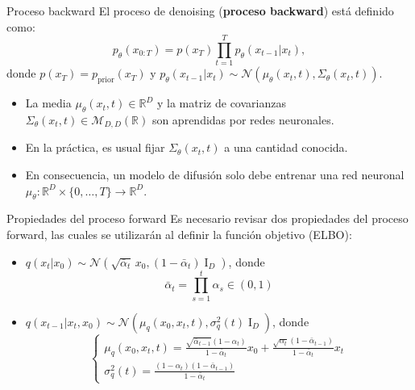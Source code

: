 \documentclass{beamer}
\newcommand{\R}{\mathbb{R}}
\begin{document}
\begin{frame}{Proceso backward}
    El proceso de denoising (\textbf{proceso backward}) está definido como:
    \begin{equation*}
        p_\theta(x_{0:T})=p(x_T)\prod_{t=1}^T p_\theta(x_{t-1}|x_t),
    \end{equation*}
    donde $p(x_T)=p_{\text{prior}}(x_T)$ y $p_\theta(x_{t-1}|x_t)\sim\mathcal{N}\left(\mu_\theta(x_t,t),\Sigma_\theta(x_t,t)\right)$.
    \begin{itemize}
        \item La media $\mu_\theta(x_t,t)\in\R^D$ y la matriz de covarianzas $\Sigma_\theta(x_t,t)\in\mathcal{M}_{D,D}(\R)$ son aprendidas por redes neuronales.
        \item En la práctica, es usual fijar $\Sigma_\theta(x_t,t)$ a una cantidad conocida.
        \item En consecuencia, un modelo de difusión solo debe entrenar una red neuronal $\mu_\theta:\R^D\times\{0,\ldots,T\}\to\R^D$.
    \end{itemize}
\end{frame}

\begin{frame}{Propiedades del proceso forward}
    Es necesario revisar dos propiedades del proceso forward, las cuales se utilizarán al definir la función objetivo (ELBO):
    \begin{itemize}
        \item $q(x_t|x_0)\sim\mathcal{N}(\sqrt{\bar\alpha_t}\,x_0,(1-\bar\alpha_t)\operatorname{I}_D)$, donde
              \begin{equation*}
                  \bar\alpha_t=\prod\limits_{s=1}^t \alpha_s\in(0,1)
              \end{equation*}
        \item $q(x_{t-1}|x_t,x_0)\sim\mathcal{N}(\mu_q(x_0,x_t,t),\sigma_q^2(t)\operatorname{I}_D)$, donde
              \begin{equation*}
                  \begin{cases}
                      \mu_q(x_0,x_t,t)=\frac{\sqrt{\bar\alpha_{t-1}}(1-\alpha_t)}{1-\bar\alpha_t}x_0 + \frac{\sqrt{\alpha_t}(1-\bar\alpha_{t-1})}{1-\bar\alpha_t}x_t \\
                      \sigma_q^2(t)=\frac{(1-\alpha_t)(1-\bar\alpha_{t-1})}{1-\bar\alpha_t}
                  \end{cases}
              \end{equation*}
    \end{itemize}
\end{frame}
\end{document}
